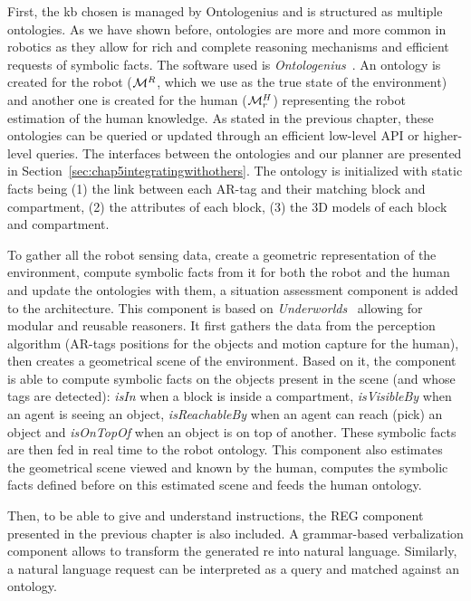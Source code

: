 \documentclass[a4paper,11pt,twoside]{StyleThese}
\begin{document}
First, the \acrlong{kb} chosen is managed by Ontologenius and is structured as multiple ontologies. As we have shown before, ontologies are more and more common in robotics as they allow for rich and complete reasoning mechanisms and efficient requests of symbolic facts. The software used is \textit{Ontologenius}~\cite{sarthou2019ontologenius}. An ontology is created for the robot ($\mathcal{M}^R$, which we use as the true state of the environment) and another one is created for the human ($\mathcal{M}^H_r$) representing the robot estimation of the human knowledge. As stated in the previous chapter, these ontologies can be queried or updated through an efficient low-level API or higher-level \sparql{} queries. The interfaces between the ontologies and our planner are presented in Section~\ref{sec:chap5integratingwithothers}. The ontology is initialized with static facts being (1) the link between each AR-tag and their matching block and compartment, (2) the attributes of each block, (3) the 3D models of each block and compartment.

To gather all the robot sensing data, create a geometric representation of the environment, compute symbolic facts from it for both the robot and the human and update the ontologies with them, a situation assessment component is added to the architecture. This component is based on \textit{Underworlds}~\cite{lemaignan2018underworlds} allowing for modular and reusable reasoners. It first gathers the data from the perception algorithm (AR-tags positions for the objects and motion capture for the human), then creates a geometrical scene of the environment. Based on it, the component is able to compute symbolic facts on the objects present in the scene (and whose tags are detected): \textit{isIn} when a block is inside a compartment, \textit{isVisibleBy} when an agent is seeing an object, \textit{isReachableBy} when an agent can reach (pick) an object and \textit{isOnTopOf} when an object is on top of another. These symbolic facts are then fed in real time to the robot ontology. This component also estimates the geometrical scene viewed and known by the human, computes the symbolic facts defined before on this estimated scene and feeds the human ontology.

Then, to be able to give and understand instructions, the REG component presented in the previous chapter is also included. A grammar-based verbalization component allows to transform the generated \acrshort{re} into natural language. Similarly, a natural language request can be interpreted as a \sparql{} query and matched against an ontology.
\end{document}
